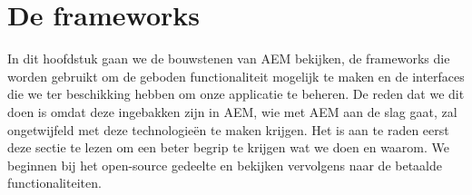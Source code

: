 
	\section{De frameworks}
	In dit hoofdstuk gaan we de bouwstenen van AEM bekijken, de frameworks die worden gebruikt om de geboden functionaliteit mogelijk te maken en de interfaces die we ter beschikking hebben om onze applicatie te beheren. De reden dat we dit doen is omdat deze ingebakken zijn in AEM, wie met AEM aan de slag gaat, zal ongetwijfeld met deze technologie\"en te maken krijgen. Het is aan te raden eerst deze sectie te lezen om een beter begrip te krijgen wat we doen en waarom. We beginnen bij het open-source gedeelte en bekijken vervolgens naar de betaalde functionaliteiten.
